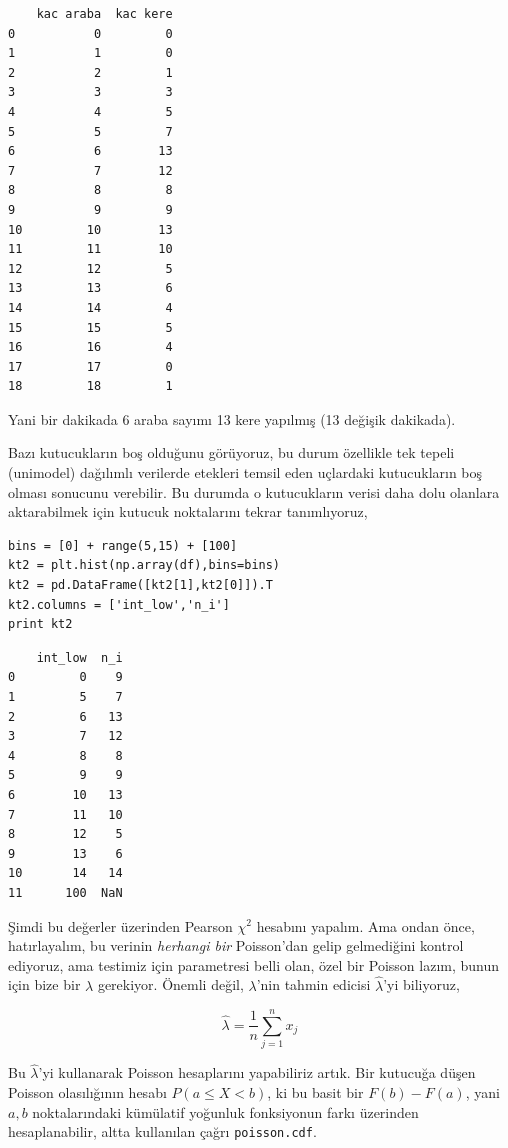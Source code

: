 \documentclass[12pt,fleqn]{article}\usepackage{../../common}
\begin{document}
\begin{verbatim}
    kac araba  kac kere
0           0         0
1           1         0
2           2         1
3           3         3
4           4         5
5           5         7
6           6        13
7           7        12
8           8         8
9           9         9
10         10        13
11         11        10
12         12         5
13         13         6
14         14         4
15         15         5
16         16         4
17         17         0
18         18         1
\end{verbatim}

Yani bir dakikada 6 araba sayımı 13 kere yapılmış (13 değişik dakikada).

Bazı kutucukların boş olduğunu görüyoruz, bu durum özellikle tek tepeli
(unimodel) dağılımlı verilerde etekleri temsil eden uçlardaki kutucukların
boş olması sonucunu verebilir. Bu durumda o kutucukların verisi daha dolu
olanlara aktarabilmek için kutucuk noktalarını tekrar tanımlıyoruz,

\begin{verbatim}
bins = [0] + range(5,15) + [100]
kt2 = plt.hist(np.array(df),bins=bins)
kt2 = pd.DataFrame([kt2[1],kt2[0]]).T
kt2.columns = ['int_low','n_i']
print kt2
\end{verbatim}

\begin{verbatim}
    int_low  n_i
0         0    9
1         5    7
2         6   13
3         7   12
4         8    8
5         9    9
6        10   13
7        11   10
8        12    5
9        13    6
10       14   14
11      100  NaN
\end{verbatim}

Şimdi bu değerler üzerinden Pearson $\chi^2$ hesabını yapalım. Ama ondan
önce, hatırlayalım, bu verinin {\em herhangi bir} Poisson'dan gelip
gelmediğini kontrol ediyoruz, ama testimiz için parametresi belli olan,
özel bir Poisson lazım, bunun için bize bir $\lambda$ gerekiyor. Önemli
değil, $\lambda$'nin tahmin edicisi $\hat{\lambda}$'yi biliyoruz,

$$ \hat{\lambda} = \frac{1}{n} \sum _{j=1}^{n}x_j $$

Bu $\hat{\lambda}$'yi kullanarak Poisson hesaplarını yapabiliriz artık. Bir
kutucuğa düşen Poisson olasılığının hesabı $P(a \le X < b)$, ki bu basit
bir $F(b)-F(a)$, yani $a,b$ noktalarındaki kümülatif yoğunluk fonksiyonun
farkı üzerinden hesaplanabilir, altta kullanılan çağrı \verb!poisson.cdf!.
\end{document}
